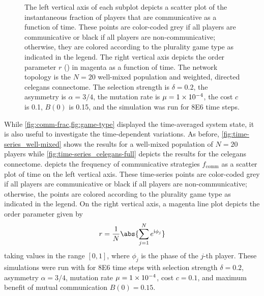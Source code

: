 \documentclass[pdflatex,lineno,referee,sn-mathphys-ay]{sn-jnl}
\newcommand{\im}{\mathrm{i}}
\begin{document}
\begin{figure}
  \caption{
    The left vertical axis of each subplot depicts a scatter plot of
    the instantaneous fraction of players that are communicative
    as a function of time.
    These points are color-coded
    grey if all players are communicative or
    black if all players are non-communicative;
    otherwise, they are colored according
    to the plurality game type as indicated in the legend.
    The right vertical axis depicts the order parameter $r$
    () in magenta as a function of time.
    The network topology is the
    $N=20$ well-mixed population
    and
    weighted, directed \gls{celegans} connectome.
    The selection strength is $\delta=0.2$,
    the asymmetry is $\alpha=3/4$,
    the mutation rate is $\mu=\num{1E-4}$,
    the cost $c$ is \num{0.1},
    $B(0)$ is \num{0.15},
    and the simulation was run for \num{8E6} time steps.
  }
  \label{fig:time-series}
\end{figure}

While \cref{fig:comm-frac,fig:game-type} displayed
the time-averaged system state,
it is also useful to investigate the time-dependent variations.
As before, \cref{fig:time-series_well-mixed} shows the results
for a well-mixed population of $N=20$ players
while \cref{fig:time-series_celegans-full} depicts the results
for the \gls{celegans} connectome.
 depicts the frequency
of communicative strategies $f_{\text{comm}}$
as a scatter plot of time on the left vertical axis.
These time-series points are color-coded
grey if all players are communicative or
black if all players are non-communicative;
otherwise, the points are colored according
to the plurality game type as indicated in the legend.
On the right vertical axis,
a magenta line plot depicts the order parameter
given by
\begin{equation}
  r = \frac{1}{N} \abs{\sum_{j=1}^N e^{\im \phi_j}}
  \label{eq:order_parameter}
\end{equation}
taking values in the range $[0,1]$,
where $\phi_j$ is the phase of the $j$-th player.
These simulations were run with
for \num{8E6} time steps with
selection strength $\delta = 0.2$,
asymmetry $\alpha = 3/4$,
mutation rate $\mu=\num{1E-4}$,
cost $c = \num{0.1}$,
and maximum benefit of mutual communication $B(0) = 0.15$.
\end{document}
